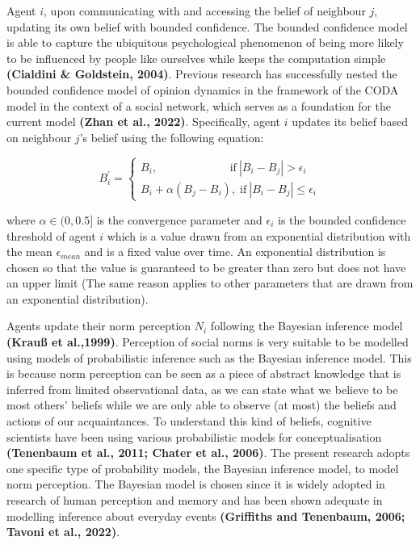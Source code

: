 \documentclass[
  11pt,
]{article}
\begin{document}
Agent \(i\), upon communicating with and accessing the belief of
neighbour \(j\), updating its own belief with bounded confidence. The
bounded confidence model is able to capture the ubiquitous psychological
phenomenon of being more likely to be influenced by people like
ourselves while keeps the computation simple \textbf{(Cialdini \&
Goldstein, 2004)}. Previous research has successfully nested the bounded
confidence model of opinion dynamics in the framework of the CODA model
in the context of a social network, which serves as a foundation for the
current model \textbf{(Zhan et al., 2022)}. Specifically, agent \(i\)
updates its belief based on neighbour \(j\)'s belief using the following
equation:

\begin{equation}
    B_i^{\prime} = \begin{cases}
        B_i, \;\;\;\;\;\;\;\;\;\;\;\;\;\;\;\;\;\;\;\;\;\;\; \text{if} \: |B_i - B_j| > \epsilon_i \\
        B_i + \alpha (B_j - B_i), \; \text{if} \: |B_i - B_j| \le \epsilon_i
    \end{cases}
\end{equation}

where \(\alpha \in (0,0.5]\) is the convergence parameter and
\(\epsilon_i\) is the bounded confidence threshold of agent \(i\) which
is a value drawn from an exponential distribution with the mean
\(\epsilon_{mean}\) and is a fixed value over time. An exponential
distribution is chosen so that the value is guaranteed to be greater
than zero but does not have an upper limit (The same reason applies to
other parameters that are drawn from an exponential distribution).

Agents update their norm perception \(N_i\) following the Bayesian
inference model \textbf{(Krauß et al.,1999)}. Perception of social norms
is very suitable to be modelled using models of probabilistic inference
such as the Bayesian inference model. This is because norm perception
can be seen as a piece of abstract knowledge that is inferred from
limited observational data, as we can state what we believe to be most
others' beliefs while we are only able to observe (at most) the beliefs
and actions of our acquaintances. To understand this kind of beliefs,
cognitive scientists have been using various probabilistic models for
conceptualisation \textbf{(Tenenbaum et al., 2011; Chater et al.,
2006)}. The present research adopts one specific type of probability
models, the Bayesian inference model, to model norm perception. The
Bayesian model is chosen since it is widely adopted in research of human
perception and memory and has been shown adequate in modelling inference
about everyday events \textbf{(Griffiths and Tenenbaum, 2006; Tavoni et
al., 2022)}.
\end{document}

